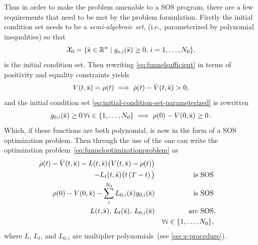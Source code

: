 Thus in order to make the problem amenable to a \ac{SOS} program, there are a
few requirements that need to be met by the problem formulation. Firstly the
initial condition set needs to be a \textit{semi-algebraic set}, (i.e.,
parameterized by polynomial inequalities) so that
%
\begin{equation}
  \label{eq:initial-condition-set-parameterized}
  \mathcal{X}_0 = \lbrace\bar{{\mathbf{\mathsf{x}}}} \in \mathbb{R}^n \mid g_{o,i}(\bar{{\mathbf{\mathsf{x}}}}) \geq 0, \, i = 1,\ldots,N_0\rbrace,
\end{equation}
%
is the initial condition set. Then rewriting \cref{eq:funnelsufficient} in terms
of positivity and equality constraints yields
\begin{equation}
  V(t,\bar{{\mathbf{\mathsf{x}}}}) = \rho(t) \implies \dot{\rho}(t) - \dot{V}(t,\bar{{\mathbf{\mathsf{x}}}}) > 0,
\end{equation}
and the initial condition set \eqref{eq:initial-condition-set-parameterized} is
rewritten
\begin{equation}
  g_{0,i}(\bar{{\mathbf{\mathsf{x}}}}) \geq 0 \, \forall i \in \lbrace1,\ldots,N_0\rbrace \implies \rho(0) - V(0,\bar{{\mathbf{\mathsf{x}}}}) \geq 0 \, .
\end{equation}
Which, if these functions are both polynomial, is now in the form of a \ac{SOS}
optimization problem. Then through the use of the  one
can write the optimization problem~\eqref{eq:funneloptimizationproblem} as
\begin{subequations}
\begin{align}
  \dot{\rho}(t) - \dot{V}(t,\bar{{\mathbf{\mathsf{x}}}}) - L(t,\bar{{\mathbf{\mathsf{x}}}}) \big( V(t,\bar{{\mathbf{\mathsf{x}}}}) - \rho(t) \big)& \nonumber \\
                                            - L_{t}(t,\bar{{\mathbf{\mathsf{x}}}})\big( t\left( T - t \right) \big)&   \label{eq:sufficient-conditions}
  &\text{is SOS}&  \\
  \rho(0) - V(0,\bar{{\mathbf{\mathsf{x}}}}) - \sum_{i}^{N_{0}} L_{0,i}(\bar{{\mathbf{\mathsf{x}}}})g_{0,i}(\bar{{\mathbf{\mathsf{x}}}})&  &\text{is SOS}& \label{eq:sufficient-conditions-2} \\
  L(t, \bar{{\mathbf{\mathsf{x}}}}), \, L_{t}(\bar{{\mathbf{\mathsf{x}}}}), \, L_{0,i}(\bar{{\mathbf{\mathsf{x}}}})& &\text{are SOS}&, \nonumber \\
  &&\forall i \in \lbrace1,\ldots,N_{0}\rbrace,& \nonumber
\end{align} 
\end{subequations}
where \(L\), \(L_{t}\), and \(L_{0,i}\) are multiplier polynomials~(see
\cref{sec:s-procedure}).

